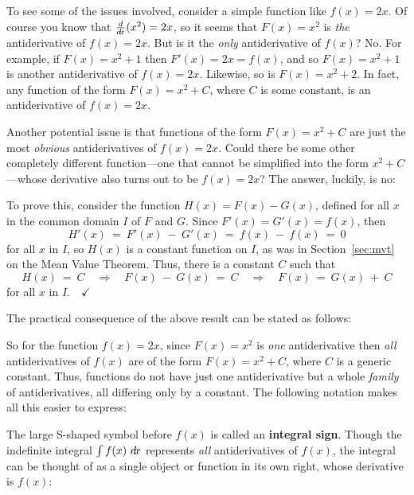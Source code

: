 To see some of the issues involved, consider a simple function like $f(x)=2x$.
Of course you know that $\frac{d}{d\!x}(x^2) = 2x$, so it seems that $F(x)=x^2$ is
\emph{the} antiderivative of $f(x)=2x$. But is it the \emph{only}
antiderivative of $f(x)$? No. For example, if $F(x)=x^2+1$ then $F'(x)=2x=f(x)$,
and so $F(x)=x^2+1$ is another antiderivative of $f(x)=2x$. Likewise, so is
$F(x)=x^2+2$. In fact, any function of the form $F(x)=x^2 + C$, where $C$ is
some constant, is an antiderivative of $f(x)=2x$.

Another potential issue is that functions of the form $F(x)=x^2 + C$ are just
the most \emph{obvious} antiderivatives of $f(x)=2x$. Could there be some other
completely different function---one that cannot be simplified into the form
$x^2 + C$---whose derivative also turns out to be $f(x) =2x$? The answer,
luckily, is no: 


To prove this, consider the function $H(x) = F(x) - G(x)$, defined for all $x$
in the common domain $I$ of $F$ and $G$. Since $F'(x) = G'(x) = f(x)$, then
\[
H'(x) ~=~ F'(x) ~-~ G'(x) ~=~ f(x) ~-~ f(x) ~=~ 0
\]
for all $x$ in $I$, so $H(x)$ is a constant function on $I$, as was  in
Section~\ref{sec:mvt} on the Mean Value Theorem. Thus, there is a constant $C$ such that
\[
H(x) ~=~ C \quad\Rightarrow\quad F(x) ~-~ G(x) ~=~ C \quad\Rightarrow\quad
F(x) ~=~ G(x) ~+~ C
\]
for all $x$ in $I.\quad\checkmark$

The practical consequence of the above result can be stated as follows:


So for the function $f(x) = 2x$, since $F(x) = x^2$ is \emph{one} antiderivative
then \emph{all} antiderivatives of $f(x)$ are of the form $F(x) = x^2 + C$,
where $C$ is a generic constant. Thus, functions do not have just one
antiderivative but a whole \emph{family} of antiderivatives, all differing only
by a constant. The following notation makes all this easier to express:

The large S-shaped symbol before $f(x)$ is called an \textbf{integral sign}.
\newpage
Though the indefinite integral $\int f(x)~d\!x$ represents \emph{all}
antiderivatives of $f(x)$, the integral can be thought of as a single object or
function in its own right, whose derivative is $f(x)$:

